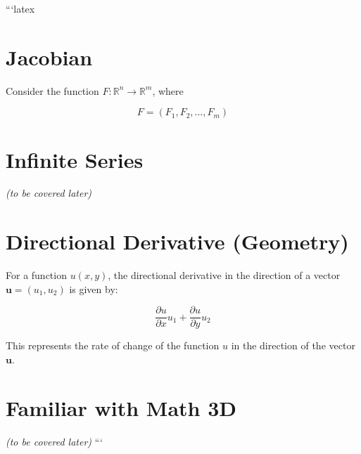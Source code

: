 ```latex
\section*{Jacobian}

Consider the function \( F : \mathbb{R}^n \to \mathbb{R}^m \), where

\[
F = (F_1, F_2, \ldots, F_m)
\]

\section*{Infinite Series}

\emph{(to be covered later)}

\section*{Directional Derivative (Geometry)}

For a function \( u(x, y) \), the directional derivative in the direction of a vector \(\mathbf{u} = (u_1, u_2)\) is given by:

\begin{equation}
    \frac{\partial u}{\partial x} u_1 + \frac{\partial u}{\partial y} u_2
\end{equation}

This represents the rate of change of the function \( u \) in the direction of the vector \(\mathbf{u}\).

\section*{Familiar with Math 3D}

\emph{(to be covered later)}
```
